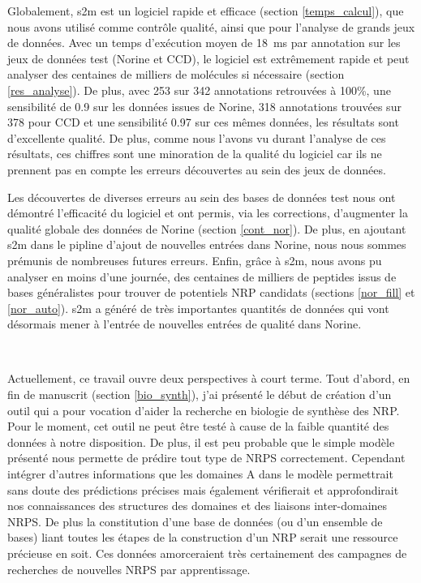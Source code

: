 Globalement, s2m est un logiciel rapide et efficace (section \ref{temps_calcul}), que nous avons utilisé comme contrôle qualité, ainsi que pour l'analyse de grands jeux de données.
Avec un temps d'exécution moyen de 18~ms par annotation sur les jeux de données test (Norine et CCD), le logiciel est extrêmement rapide et peut analyser des centaines de milliers de molécules si nécessaire (section \ref{res_analyse}).
De plus, avec 253 sur 342 annotations retrouvées à 100\%, une sensibilité de 0.9 sur les données issues de Norine, 318 annotations trouvées sur 378 pour CCD et une sensibilité 0.97 sur ces mêmes données, les résultats sont d'excellente qualité.
De plus, comme nous l'avons vu durant l'analyse de ces résultats, ces chiffres sont une minoration de la qualité du logiciel car ils ne prennent pas en compte les erreurs découvertes au sein des jeux de données.

Les découvertes de diverses erreurs au sein des bases de données test nous ont démontré l'efficacité du logiciel et ont permis, via les corrections, d'augmenter la qualité globale des données de Norine (section \ref{cont_nor}).
De plus, en ajoutant s2m dans le pipline d'ajout de nouvelles entrées dans Norine, nous nous sommes prémunis de nombreuses futures erreurs.
Enfin, grâce à s2m, nous avons pu analyser en moins d'une journée, des centaines de milliers de peptides issus de bases généralistes pour trouver de potentiels NRP candidats (sections \ref{nor_fill} et \ref{nor_auto}).
s2m a généré de très importantes quantités de données qui vont désormais mener à l'entrée de nouvelles entrées de qualité dans Norine.


~~


Actuellement, ce travail ouvre deux perspectives à court terme.
Tout d'abord, en fin de manuscrit (section \ref{bio_synth}), j'ai présenté le début de création d'un outil qui a pour vocation d'aider la recherche en biologie de synthèse des NRP.
Pour le moment, cet outil ne peut être testé à cause de la faible quantité des données à notre disposition.
De plus, il est peu probable que le simple modèle présenté nous permette de prédire tout type de NRPS correctement.
Cependant intégrer d'autres informations que les domaines A dans le modèle permettrait sans doute des prédictions précises mais également vérifierait et approfondirait nos connaissances des structures des domaines et des liaisons inter-domaines NRPS.
De plus la constitution d'une base de données (ou d'un ensemble de bases) liant toutes les étapes de la construction d'un NRP serait une ressource précieuse en soit.
Ces données amorceraient très certainement des campagnes de recherches de nouvelles NRPS par apprentissage.

